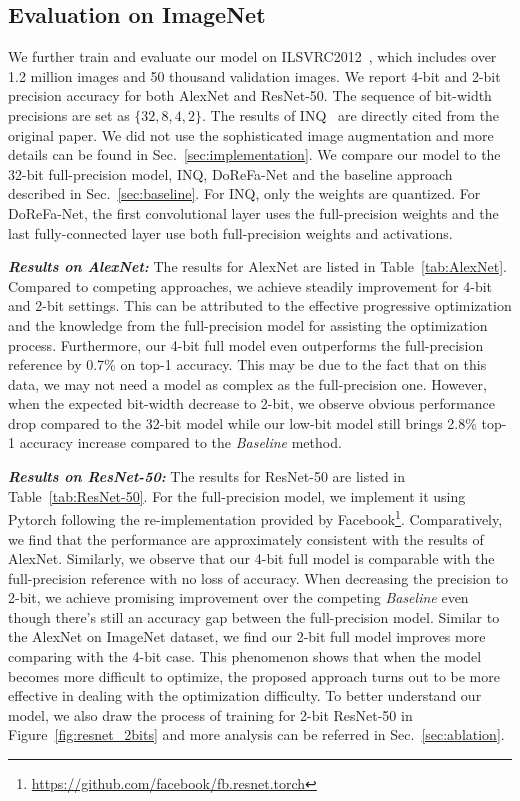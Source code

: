 \subsection{Evaluation on ImageNet}

We further train and evaluate our model on ILSVRC2012~\cite{russakovsky2015imagenet}, which includes over 1.2 million images and 50 thousand validation images. We report 4-bit and 2-bit precision accuracy for both AlexNet and ResNet-50. The sequence of bit-width precisions are set as $\{32, 8, 4, 2\}$. The results of INQ~\cite{zhou2017incremental} are directly cited from the original paper. We did not use the sophisticated image augmentation and more details can be found in Sec.~\ref{sec:implementation}. We compare our model to the 32-bit full-precision model, INQ, DoReFa-Net and the baseline approach described in Sec.~\ref{sec:baseline}. For INQ, only the weights are quantized. For DoReFa-Net, the first convolutional layer uses the full-precision weights and the last fully-connected layer use both full-precision weights and activations.


\emph{\textbf{Results on AlexNet:}}
The results for AlexNet are listed in Table~\ref{tab:AlexNet}. Compared to competing approaches, we achieve steadily improvement for 4-bit and 2-bit settings. This can be attributed to the effective progressive optimization and the knowledge from the full-precision model for assisting the optimization process. Furthermore, our 4-bit full model even outperforms the full-precision reference by 0.7\% on top-1 accuracy. This may be due to the fact that on this data, we may not need a model as complex as the full-precision one. However, when the expected bit-width decrease to 2-bit, we observe obvious performance drop compared to the 32-bit model while our low-bit model still brings 2.8\% top-1 accuracy increase compared to the \emph{Baseline} method.


\emph{\textbf{Results on ResNet-50:}}
The results for ResNet-50 are listed in Table~\ref{tab:ResNet-50}. For the full-precision model, we implement it using Pytorch following the re-implementation provided by Facebook\footnote{\url{https://github.com/facebook/fb.resnet.torch}}.
Comparatively, we find that the performance are approximately consistent with the results of AlexNet. Similarly, we observe that our 4-bit full model is comparable with the full-precision reference with no loss of accuracy. When decreasing the precision to 2-bit, we achieve promising improvement over the competing \emph{Baseline} even though there's still an accuracy gap between the full-precision model. Similar to the AlexNet on ImageNet dataset, we find our 2-bit full model improves more comparing with the 4-bit case. This phenomenon shows that when the model becomes more difficult to optimize, the proposed approach turns out to be more effective in dealing with the optimization difficulty.
To better understand our model, we also draw the process of training for 2-bit ResNet-50 in Figure~\ref{fig:resnet_2bits} and more analysis can be referred in Sec.~\ref{sec:ablation}.




